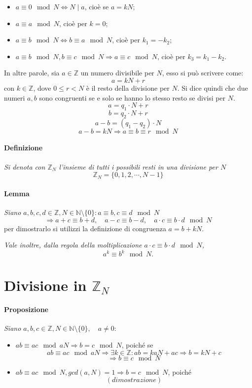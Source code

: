 \documentclass[a4paper]{report}
\begin{document}
\begin{itemize}
\item $a\equiv 0 \mod{N} \Leftrightarrow N\mid a$, cioè se $a=kN$;
\item $a\equiv a\mod{N}$, cioè per $k=0$;
\item $a\equiv b\mod{N} \Leftrightarrow b\equiv a\mod{N}$, cioè per $k_1=-k_2$;
\item $a\equiv b\mod {N}, b\equiv c\mod{N} \Rightarrow a\equiv c\mod {N}$, cioè per $k_3=k_1-k_2$.
\end{itemize}

In altre parole, sia $a\in \mathbb{Z}$ un numero divisibile per $N$, esso si può scrivere come:
$$a=kN+r$$
con $k\in \mathbb{Z}$, dove $0\leq r < N$ è il resto della divisione per $N$. Si dice quindi che due numeri $a,b$ sono congruenti se e solo se hanno lo stesso resto se divisi per $N$.
$$a=q_1\cdot N + r$$
$$b=q_2\cdot N + r$$
$$a-b=(q_1-q_2)\cdot N$$
$$a-b=kN\Rightarrow a\equiv b\equiv r \mod{N}$$
\paragraph{Definizione} \textit{Si denota con $\mathbb{Z}_N$ l'insieme di tutti i possibili resti in una divisione per $N$}
$$\mathbb{Z}_N=\{0,1,2,\cdots,N-1\}$$
\paragraph{Lemma} \textit{Siano $a,b,c,d\in \mathbb{Z}, N\in \mathbb{N}\setminus \{ 0\} : a\equiv b, c\equiv d \mod{N}$}
$$\Rightarrow a+c\equiv b+d,\quad a-c\equiv b-d,\quad a\cdot c\equiv b\cdot d \mod{N}$$
per dimostrarlo si utilizzi la definizione di congruenza $a=b+kN$.

\textit{Vale inoltre, dalla regola della moltiplicazione $a\cdot c\equiv b\cdot d \mod{N}$,}
$$a^k\equiv b^k \mod{N}.$$
\section{Divisione in $\mathbb{Z}_N$}
\paragraph{Proposizione} 
\textit{Siano $a,b,c\in \mathbb{Z}, N\in \mathbb{N}\setminus \{ 0\},\quad a\neq 0 $}:
\begin{itemize}
\item $ab\equiv ac \mod{aN} \Rightarrow b=c\mod{N}$, poiché se
$$ab\equiv ac \mod{aN} \Rightarrow \exists k\in \mathbb{Z}: ab=kaN+ac\Rightarrow b=kN+c$$
$$\Rightarrow b\equiv c \mod{N}$$
\item $ab\equiv ac \mod{N}, gcd(a,N)=1 \Rightarrow b=c\mod{N}$, poiché
$$(dimostrazione)$$
\end{itemize}
\end{document}
